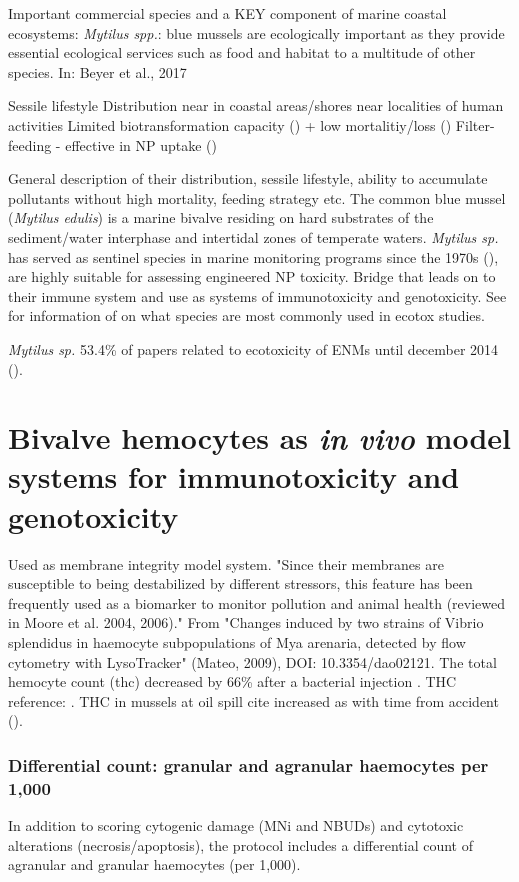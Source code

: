 Important commercial species and a KEY component of marine coastal ecosystems: \emph{Mytilus spp.}: blue mussels are ecologically important as they provide essential ecological services such as food and habitat to a multitude of other species. In: Beyer et al., 2017

Sessile lifestyle
Distribution near in coastal areas/shores near localities of human activities
Limited biotransformation capacity (\cite{Beyer2017b}) + low mortalitiy/loss (\cite{Ale2019})
Filter-feeding - effective in NP uptake (\cite{Canesi2012})



General description of their distribution, sessile lifestyle, ability to accumulate pollutants without high mortality, feeding strategy etc. The common blue mussel (\emph{Mytilus edulis}) is a marine bivalve residing on hard substrates of the sediment/water interphase and intertidal zones of temperate waters.  \emph{Mytilus sp.} has served as sentinel species in marine monitoring programs since the 1970s (\cite{Goldberg1975}), are highly suitable for assessing engineered NP toxicity. Bridge that leads on to their immune system and use as systems of immunotoxicity and genotoxicity. See \cite{Rocha2015} for information of on what species are most commonly used in ecotox studies.

\emph{Mytilus sp.} 53.4\% of papers related to ecotoxicity of ENMs until december 2014 (\cite{Rocha2015}).


\section{Bivalve hemocytes as \emph{in vivo} model systems for immunotoxicity and genotoxicity}
Used as membrane integrity model system. "Since their membranes are susceptible to being destabilized by different stressors, this feature has been frequently used as a biomarker to monitor pollution and animal health (reviewed in Moore et al. 2004, 2006)." From "Changes induced by two strains of Vibrio splendidus in haemocyte subpopulations of Mya arenaria, detected by flow cytometry with LysoTracker" (Mateo, 2009), DOI: 10.3354/dao02121. The total hemocyte count (\acrshort{thc}) decreased by 66\% after a bacterial injection \cite{Parisi2008}. THC reference: \cite{Ciacci2012}. THC in mussels at oil spill cite increased as with time from accident (\cite{Dyrynda1997}).

\subsubsection{Differential count: granular and agranular haemocytes per 1,000} %
In addition to scoring cytogenic damage (MNi and NBUDs) and cytotoxic alterations (necrosis/apoptosis), the protocol includes a differential count of agranular and granular haemocytes (per 1,000).


